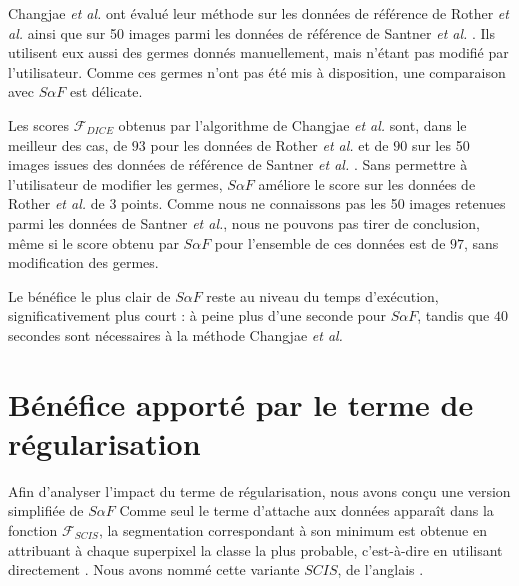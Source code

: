 \begin{emodif}

Changjae \textit{et al.}  \cite{Changjae2017Robust} ont évalué leur méthode sur les données de référence de Rother \textit{et al.} \cite{rother2004grabcut} ainsi que sur 50 images parmi les données de référence de Santner \textit{et al.} \cite{santner2010interactive}. Ils utilisent eux aussi des germes donnés manuellement, mais n'étant pas modifié par l'utilisateur. Comme ces germes n'ont pas été mis à disposition, une comparaison avec $S \alpha F$ est délicate.

Les scores $\mathcal{F}_{DICE}$  obtenus par l'algorithme de Changjae \textit{et al.}  \cite{Changjae2017Robust} sont, dans le meilleur des cas, de $93$ pour les données de Rother \textit{et al.} \cite{rother2004grabcut} et de $90$ sur les 50 images issues des données de référence de Santner \textit{et al.} \cite{santner2010interactive}. Sans permettre à l'utilisateur de modifier les germes, $S \alpha F$ améliore le score sur les données de Rother \textit{et al.} \cite{rother2004grabcut} de $3$ points. Comme nous ne connaissons pas les 50 images retenues parmi les données de Santner \textit{et al.}, nous ne pouvons pas tirer de conclusion, même si le score obtenu par $S \alpha F$ pour l'ensemble de ces données est de $97$, sans modification des germes. 

Le bénéfice le plus clair de $S \alpha F$ reste au niveau du temps d'exécution, significativement plus court : à peine plus d'une seconde pour $S \alpha F$, tandis que $40$ secondes sont nécessaires à la méthode Changjae \textit{et al.}  

\end{emodif}


\section{Bénéfice apporté par le terme de régularisation}

Afin d'analyser l'impact du terme de régularisation, nous avons conçu une version simplifiée de $S \alpha F$ 
Comme seul le terme d'attache aux données apparaît dans la fonction  $\mathcal{F}_{SCIS}$, la segmentation correspondant à son minimum est obtenue en attribuant à chaque superpixel la classe la plus probable, c'est-à-dire en utilisant directement .  Nous avons nommé cette variante $SCIS$, de l'anglais . 

